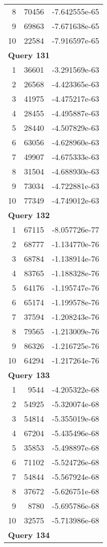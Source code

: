 \begin{longtable}[{p}]{@{}rrp{}@{}}
8 & 70456 & -7.642555e-65 \\
9 & 69863 & -7.671638e-65 \\
10 & 22584 & -7.916597e-65 \\
\midrule
\multicolumn{3}{l}{\bfseries Query 131} \\
1 & 36601 & -3.291569e-63 \\
2 & 26568 & -4.423365e-63 \\
3 & 41975 & -4.475217e-63 \\
4 & 28455 & -4.495887e-63 \\
5 & 28440 & -4.507829e-63 \\
6 & 63056 & -4.628960e-63 \\
7 & 49907 & -4.675333e-63 \\
8 & 31504 & -4.688930e-63 \\
9 & 73034 & -4.722881e-63 \\
10 & 77349 & -4.749012e-63 \\
\midrule
\multicolumn{3}{l}{\bfseries Query 132} \\
1 & 67115 & -8.057726e-77 \\
2 & 68777 & -1.134770e-76 \\
3 & 68784 & -1.138914e-76 \\
4 & 83765 & -1.188328e-76 \\
5 & 64176 & -1.195747e-76 \\
6 & 65174 & -1.199578e-76 \\
7 & 37594 & -1.208243e-76 \\
8 & 79565 & -1.213009e-76 \\
9 & 86326 & -1.216725e-76 \\
10 & 64294 & -1.217264e-76 \\
\midrule
\multicolumn{3}{l}{\bfseries Query 133} \\
1 & 9544 & -4.205322e-68 \\
2 & 54925 & -5.320074e-68 \\
3 & 54814 & -5.355019e-68 \\
4 & 67204 & -5.435496e-68 \\
5 & 35853 & -5.498897e-68 \\
6 & 71102 & -5.524726e-68 \\
7 & 54844 & -5.567924e-68 \\
8 & 37672 & -5.626751e-68 \\
9 & 8780 & -5.695786e-68 \\
10 & 32575 & -5.713986e-68 \\
\midrule
\multicolumn{3}{l}{\bfseries Query 134} \\

\end{longtable}
